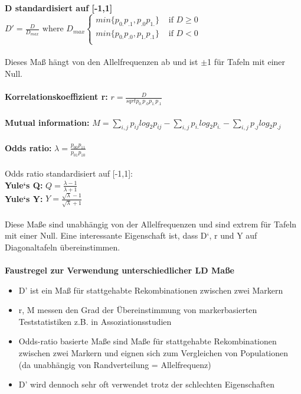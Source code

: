 \textbf{D standardisiert auf [-1,1]}\\
$D'=\displaystyle \frac{D}{D_{max}} \text{ where } D_{max}
\begin{cases}
	min\{p_{0.}p_{.1}, p_{.0}p_{1.}\} &\text{ if } D\geq 0 \\
	min\{p_{0.}p_{.0}, p_{1.}p_{.1}\} &\text{ if } D < 0\\
\end{cases}
$
\\\\
Dieses Maß hängt von den Allelfrequenzen ab und ist $\pm$1 für Tafeln mit einer Null.
\\\\
\textbf{Korrelationskoeffizient r:}
$r=\displaystyle \frac{D}{sqrt{p_{0.}p_{.0}p_{1.}p_{.1}}}$
\\\\
\textbf{Mutual information:} $M = \displaystyle \sum_{i,j} p_{ij} log_2p_{ij} - \sum_{i,j} p_{i.}log_2p_{i.} - \sum_{i,j} p_{.j} log_2 p_{.j}$
\\\\
\textbf{Odds ratio:} $\lambda=\displaystyle \frac{p_{00}p_{11}}{p_{01}p_{10}}$\\\\
Odds ratio standardisiert auf [-1,1]:\\
\textbf{Yule‘s Q:} $Q=\displaystyle \frac{\lambda-1}{\lambda+1}$\\
\textbf{Yule‘s Y:} $Y=\displaystyle \frac{\sqrt{\lambda}-1}{\sqrt{\lambda}+1}$
\\\\
Diese Maße sind unabhängig von der Allelfrequenzen und sind extrem
für Tafeln mit einer Null. Eine interessante Eigenschaft ist, dass D‘, r
und Y auf Diagonaltafeln übereinstimmen.
\\\\
\textbf{Faustregel zur Verwendung unterschiedlicher LD Maße}
\begin{itemize}
	\item D' ist ein Maß für stattgehabte Rekombinationen zwischen zwei Markern
	\item r, M messen den Grad der Übereinstimmung von markerbasierten Teststatistiken z.B. in Assoziationsstudien
	\item Odds-ratio basierte Maße sind Maße für stattgehabte Rekombinationen zwischen zwei Markern und eignen sich zum Vergleichen von Populationen (da unabhängig von Randverteilung = Allelfrequenz)
	\item D' wird dennoch sehr oft verwendet trotz der schlechten Eigenschaften
\end{itemize}

